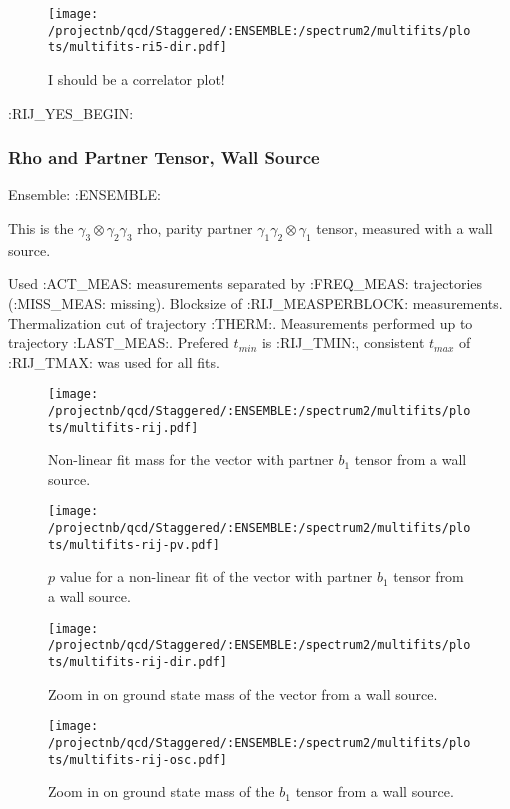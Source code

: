 \begin{figure}[H]
\centering
\texttt{[image: /projectnb/qcd/Staggered/:ENSEMBLE:/spectrum2/multifits/plots/multifits-ri5-dir.pdf]}
\caption{I should be a correlator plot!}
\end{figure}

\clearpage

:RIJ_YES_BEGIN:
\subsubsection{Rho and Partner Tensor, Wall Source}

Ensemble: :ENSEMBLE:

This is the $\gamma_3 \otimes \gamma_2 \gamma_3$ rho, parity partner $\gamma_1 \gamma_2 \otimes \gamma_1$ tensor, measured with a wall source.

{\small{Used :ACT_MEAS: measurements separated by :FREQ_MEAS: trajectories (:MISS_MEAS: missing). Blocksize of :RIJ_MEASPERBLOCK: measurements. Thermalization cut of trajectory :THERM:. Measurements performed up to trajectory :LAST_MEAS:. Prefered $t_{min}$ is :RIJ_TMIN:, consistent $t_{max}$ of :RIJ_TMAX: was used for all fits.}}


\begin{multicols}{2}
\begin{figure}[H]
\centering
\texttt{[image: /projectnb/qcd/Staggered/:ENSEMBLE:/spectrum2/multifits/plots/multifits-rij.pdf]}
\caption{Non-linear fit mass for the vector with partner $b_1$ tensor from a wall source.}
\end{figure}
\columnbreak
\begin{figure}[H]
\centering
\texttt{[image: /projectnb/qcd/Staggered/:ENSEMBLE:/spectrum2/multifits/plots/multifits-rij-pv.pdf]}
\caption{$p$ value for a non-linear fit of the vector with partner $b_1$ tensor from a wall source.}
\end{figure}
\end{multicols}

\begin{multicols}{2}
\begin{figure}[H]
\centering
\texttt{[image: /projectnb/qcd/Staggered/:ENSEMBLE:/spectrum2/multifits/plots/multifits-rij-dir.pdf]}
\caption{Zoom in on ground state mass of the vector from a wall source.}
\end{figure}
\columnbreak
\begin{figure}[H]
\centering
\texttt{[image: /projectnb/qcd/Staggered/:ENSEMBLE:/spectrum2/multifits/plots/multifits-rij-osc.pdf]}
\caption{Zoom in on ground state mass of the $b_1$ tensor from a wall source.}
\end{figure}
\end{multicols}

